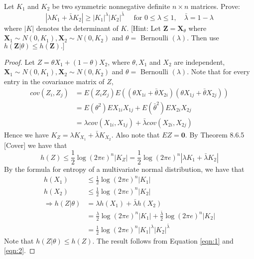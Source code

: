 \begin{exercise}{ Let $K_{1}$ and $K_{2}$ be two symmetric nonnegative definite $n \times n$ matrices. Prove:
  $$
  \left|\lambda K_{1}+\bar{\lambda} K_{2}\right| \geq\left|K_{1}\right|^{\lambda}\left|K_{2}\right|^{\bar{\lambda}} \quad \text { for } 0 \leq \lambda \leq 1, \quad \bar{\lambda}=1-\lambda
  $$
  where $|K|$ denotes the determinant of $K .$ [Hint: Let $\mathbf{Z}=\mathbf{X}_{\theta}$ where $\mathbf{X}_{1} \sim N\left(0, K_{1}\right), \mathbf{X}_{2} \sim N\left(0, K_{2}\right)$ and $\theta=$ Bernoulli $(\lambda) .$ Then
  use $h(\mathbf{Z} | \theta) \leq h(\mathbf{Z}) .]$}
  \begin{proof}
  Let $Z = \theta X_1 + (1 - \theta) X_2$, where $\theta,X_1$ and $X_2$ are independent, $\mathbf{X}_{1} \sim N\left(0, K_{1}\right), \mathbf{X}_{2} \sim N\left(0, K_{2}\right)$ and $\theta=$ Bernoulli $(\lambda) .$ Note that for every entry in the covariance matrix of $Z$,
  \begin{equation}
    \begin{aligned}
      cov(Z_i,Z_j) &= E(Z_i Z_j) E((\theta X_{1i} + \bar{\theta} X_{2i})(\theta X_{1j} + \bar{\theta} X_{2j})) \\
      &= E(\theta^2) E X_{1i} X_{1j} + E(\bar{\theta}^2) E X_{2i} X_{2j} \\
      &= \lambda cov(X_{1i},X_{1j}) + \bar{\lambda} cov (X_{2i},X_{2j})
    \end{aligned}
  \end{equation}
  Hence we have $K_Z = \lambda K_{X_1} + \bar{\lambda} K_{X_2}$. Also note that $EZ = \mathbf{0}$. By Theorem 8.6.5 [Cover] we have that 
  \begin{equation}
    h(Z) \le \frac{1}{2} \log (2\pi e)^n \left| K_Z \right| = \frac{1}{2} \log (2\pi e)^n \left|  \lambda K_{1} + \bar{\lambda} K_{2} \right|
    \label{eqn:1}
  \end{equation}
  By the formula for entropy of a multivariate normal distribution, we have that
  \begin{equation}
    \begin{aligned}
      h(X_1) &\le \frac{1}{2} \log (2\pi e)^n \left| K_1 \right| \\
      h(X_2) &\le \frac{1}{2} \log (2\pi e)^n \left| K_2 \right| \\
      \Rightarrow h(Z|\theta) &= \lambda h(X_1) + \bar{\lambda}h(X_2) \\
      &=  \frac{\lambda}{2} \log (2\pi e)^n \left| K_1 \right| + \frac{\bar{\lambda}}{2} \log (2\pi e)^n \left| K_2 \right| \\
      &= \frac{1}{2} \log (2\pi e)^n \left| K_{1} \right|^{\lambda} \left| K_{2} \right|^{\bar{\lambda}}
    \end{aligned}
    \label{eqn:2}
  \end{equation}
  Note that $h(Z|\theta) \le h(Z)$. The result follows from Equation \ref{eqn:1} and \ref{eqn:2}.
  \end{proof}
  \label{ex2}
\end{exercise}

